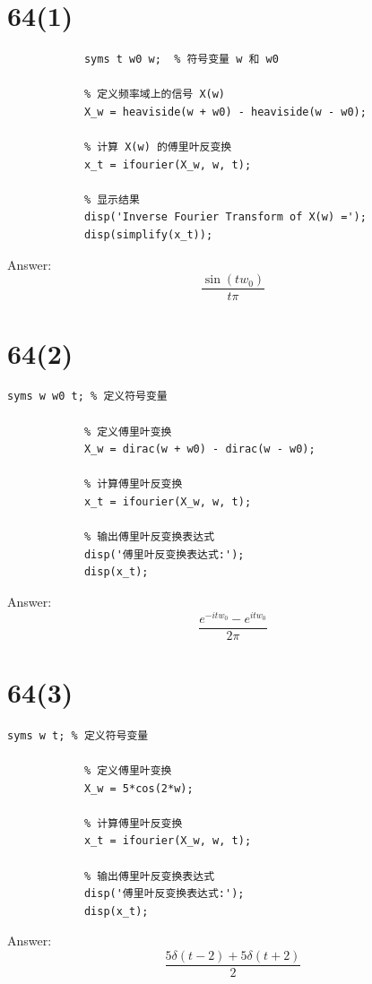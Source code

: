 \documentclass{article}
\begin{document}
    \section*{64(1)}
        \begin{lstlisting}[caption={题64(1)MATLAB代码}, label={lst:matlab}]
            % 定义变量和参数
            syms t w0 w;  % 符号变量 w 和 w0

            % 定义频率域上的信号 X(w)
            X_w = heaviside(w + w0) - heaviside(w - w0);

            % 计算 X(w) 的傅里叶反变换
            x_t = ifourier(X_w, w, t);

            % 显示结果
            disp('Inverse Fourier Transform of X(w) =');
            disp(simplify(x_t));

        \end{lstlisting}
        Answer: \[\frac{{\sin \left( {t{w_0}} \right)}}{{t\pi }}\]
    \section*{64(2)}
        \begin{lstlisting}[caption={题64(2)MATLAB代码}, label={lst:matlab}]
            syms w w0 t; % 定义符号变量

            % 定义傅里叶变换
            X_w = dirac(w + w0) - dirac(w - w0);

            % 计算傅里叶反变换
            x_t = ifourier(X_w, w, t);

            % 输出傅里叶反变换表达式
            disp('傅里叶反变换表达式:');
            disp(x_t);

        \end{lstlisting}
        Answer: \[\frac{{{e^{ - it{w_0}}} - {e^{it{w_0}}}}}{{2\pi }}\]
    \section*{64(3)}
        \begin{lstlisting}[caption={题64(3)MATLAB代码}, label={lst:matlab}]
            syms w t; % 定义符号变量

            % 定义傅里叶变换
            X_w = 5*cos(2*w);

            % 计算傅里叶反变换
            x_t = ifourier(X_w, w, t);

            % 输出傅里叶反变换表达式
            disp('傅里叶反变换表达式:');
            disp(x_t);

        \end{lstlisting}
        Answer: \[\frac{{5\delta \left( {t - 2} \right) + 5\delta \left( {t + 2} \right)}}{2}\]
\end{document}
